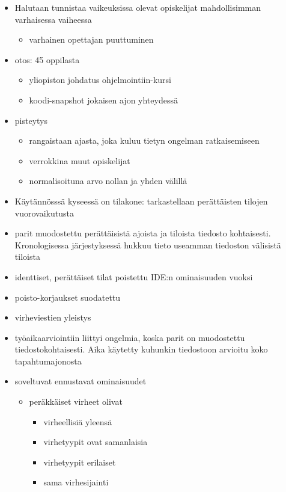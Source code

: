 \begin{itemize}
    \item Halutaan tunnistaa vaikeuksissa olevat opiskelijat mahdollisimman varhaisessa vaiheessa
    \begin{itemize}
        \item varhainen opettajan puuttuminen
    \end{itemize}
    \item otos: 45 oppilasta
    \begin{itemize}
        \item yliopiston johdatus ohjelmointiin-kursi
        \item koodi-snapshot jokaisen ajon yhteydessä
    \end{itemize}
    \item pisteytys
    \begin{itemize}
        \item rangaistaan ajasta, joka kuluu tietyn ongelman ratkaisemiseen
        \item verrokkina muut opiskelijat
        \item normalisoituna arvo nollan ja yhden välillä
    \end{itemize}
    \item Käytännösssä kyseessä on tilakone: tarkastellaan perättäisten tilojen vuorovaikutusta
    \item parit muodostettu perättäisistä ajoista ja tiloista tiedosto kohtaisesti. Kronologisessa järjestyksessä hukkuu tieto useamman tiedoston välisistä tiloista
    \item identtiset, perättäiset tilat poistettu IDE:n ominaisuuden vuoksi
    \item poisto-korjaukset suodatettu
    \item virheviestien yleistys
    \item työaikaarviointiin liittyi ongelmia, koska parit on muodostettu tiedostokohtaisesti. Aika käytetty kuhunkin tiedostoon arvioitu koko tapahtumajonosta
    \item soveltuvat ennustavat ominaisuudet
    \begin{itemize}
        \item peräkkäiset virheet olivat
        \begin{itemize}
            \item virheellisiä yleensä
            \item virhetyypit ovat samanlaisia
            \item virhetyypit erilaiset
            \item sama virhesijainti

\end{itemize}
\end{itemize}
\end{itemize}
